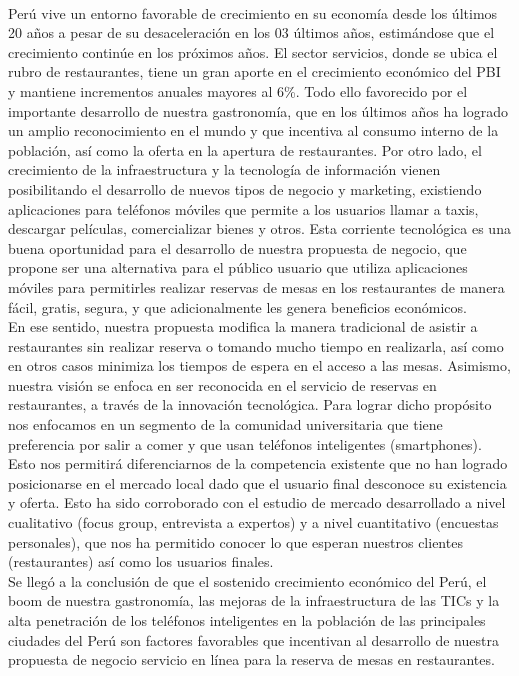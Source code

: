 \begin{large}
\\
Perú vive un entorno favorable de crecimiento en su economía desde los últimos 20 años a pesar de su desaceleración en los 03 últimos años, estimándose que el crecimiento continúe en los próximos años. El sector servicios, donde se ubica el rubro de restaurantes, tiene un gran aporte en el crecimiento económico del PBI y mantiene incrementos anuales mayores al 6\%. Todo ello favorecido por el importante desarrollo de nuestra gastronomía, que en los últimos años ha logrado un amplio reconocimiento en el mundo y que incentiva al consumo interno de la población, así como la oferta en la apertura de restaurantes. Por otro lado, el crecimiento de la infraestructura y la tecnología de información vienen posibilitando el desarrollo de nuevos tipos de negocio y marketing, existiendo aplicaciones para teléfonos móviles que permite a los usuarios llamar a taxis, descargar películas, comercializar bienes y otros. Esta corriente tecnológica es una buena oportunidad para el desarrollo de nuestra propuesta de negocio, que propone ser una alternativa para el público usuario que utiliza aplicaciones móviles para permitirles realizar reservas de mesas en los restaurantes de manera fácil, gratis, segura, y que adicionalmente les genera beneficios económicos. 
\\
En ese sentido, nuestra propuesta modifica la manera tradicional de asistir a restaurantes sin realizar reserva o tomando mucho tiempo en realizarla, así como en otros casos minimiza los tiempos de espera en el acceso a las mesas. Asimismo, nuestra visión se enfoca en ser reconocida en el servicio de reservas en restaurantes, a través de la innovación tecnológica. Para lograr dicho propósito nos enfocamos en un segmento de la comunidad universitaria que tiene preferencia por salir a comer y que usan teléfonos inteligentes (smartphones).
Esto nos permitirá diferenciarnos de la competencia existente que no han logrado posicionarse en el mercado local dado que el usuario final desconoce su existencia y oferta. Esto ha sido corroborado con el estudio de mercado desarrollado a nivel cualitativo (focus group, entrevista a expertos) y a nivel cuantitativo (encuestas personales), que nos ha permitido conocer lo que esperan nuestros clientes (restaurantes) así como los usuarios finales.
\\
Se llegó a la conclusión de que el sostenido crecimiento económico del Perú, el boom de nuestra gastronomía, las mejoras de la infraestructura de las TICs y la alta penetración de los teléfonos inteligentes en la población de las principales ciudades del Perú son factores favorables que incentivan al desarrollo de nuestra propuesta de negocio servicio en línea para la reserva de mesas en restaurantes. 

\end{large}

